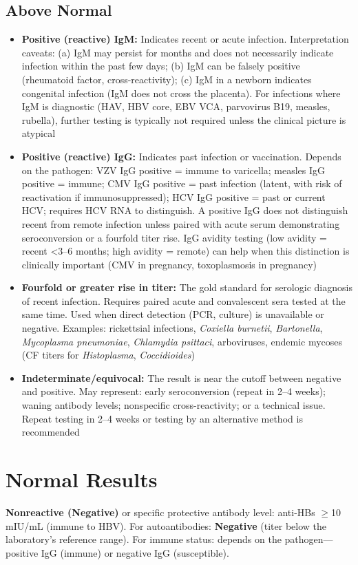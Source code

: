 \subsection*{Above Normal}
\begin{itemize}
  \item \textbf{Positive (reactive) IgM:} Indicates recent or acute infection. Interpretation caveats: (a) IgM may persist for months and does not necessarily indicate infection within the past few days; (b) IgM can be falsely positive (rheumatoid factor, cross-reactivity); (c) IgM in a newborn indicates congenital infection (IgM does not cross the placenta). For infections where IgM is diagnostic (HAV, HBV core, EBV VCA, parvovirus B19, measles, rubella), further testing is typically not required unless the clinical picture is atypical
  \item \textbf{Positive (reactive) IgG:} Indicates past infection or vaccination. Depends on the pathogen: VZV IgG positive = immune to varicella; measles IgG positive = immune; CMV IgG positive = past infection (latent, with risk of reactivation if immunosuppressed); HCV IgG positive = past or current HCV; requires HCV RNA to distinguish. A positive IgG does not distinguish recent from remote infection unless paired with acute serum demonstrating seroconversion or a fourfold titer rise. IgG avidity testing (low avidity = recent <3--6 months; high avidity = remote) can help when this distinction is clinically important (CMV in pregnancy, toxoplasmosis in pregnancy)
  \item \textbf{Fourfold or greater rise in titer:} The gold standard for serologic diagnosis of recent infection. Requires paired acute and convalescent sera tested at the same time. Used when direct detection (PCR, culture) is unavailable or negative. Examples: rickettsial infections, \textit{Coxiella burnetii}, \textit{Bartonella}, \textit{Mycoplasma pneumoniae}, \textit{Chlamydia psittaci}, arboviruses, endemic mycoses (CF titers for \textit{Histoplasma}, \textit{Coccidioides})
  \item \textbf{Indeterminate/equivocal:} The result is near the cutoff between negative and positive. May represent: early seroconversion (repeat in 2--4 weeks); waning antibody levels; nonspecific cross-reactivity; or a technical issue. Repeat testing in 2--4 weeks or testing by an alternative method is recommended
\end{itemize}

\section*{Normal Results}
\textbf{Nonreactive (Negative)} or specific protective antibody level: anti-HBs $\geq$10 mIU/mL (immune to HBV). For autoantibodies: \textbf{Negative} (titer below the laboratory's reference range). For immune status: depends on the pathogen---positive IgG (immune) or negative IgG (susceptible).

